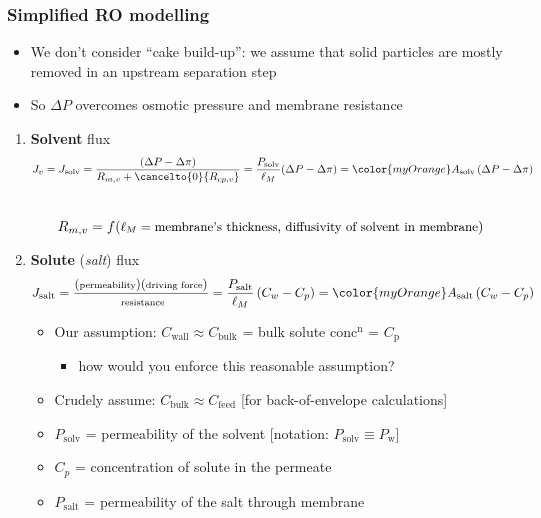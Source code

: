\begin{frame}\frametitle{Simplified RO modelling}
	\begin{itemize}
		\item	We don't consider ``cake build-up'': we assume that solid particles are mostly removed in an upstream separation step
		\item	So $\Delta P$ overcomes osmotic pressure and membrane resistance
	\end{itemize}
	\vspace{-6pt}
	\begin{enumerate}
		\item	\textbf{Solvent} flux
			\[	J_v = J_\text{solv} = \frac{(\Delta P - \Delta \pi)}{R_{m,v} + \cancelto{0}{R_{cp,v}}} = \frac{P_\text{solv}}{\ell_M}(\Delta P - \Delta \pi) = {\color{myOrange}A_\text{solv}\left(\Delta P - \Delta \pi\right)} \] \\
			\[	R_{m,v} = f(\text{\small $\ell_M=\text{membrane's thickness}$, diffusivity of solvent in membrane})\]
		\item	\textbf{Solute} (\emph{salt}) flux
			\[
				J_\text{salt} = {\scriptsize \dfrac{(\text{permeability})(\text{driving force})}{\text{ resistance}} }= \dfrac{P_\text{salt}}{\ell_M} \left(C_w - C_p\right) = {\color{myOrange}A_\text{salt} \left(C_w - C_p\right)}
			\]
			\begin{itemize}
				\item	Our assumption: $C_\text{wall} \approx C_\text{bulk}$ = bulk solute conc$^\text{n}$ = $C_\text{p}$
				\begin{itemize}
					\item	how would you enforce this reasonable assumption?  %
				\end{itemize}
				\item	Crudely assume: $C_\text{bulk}  \approx C_\text{feed}$ {\scriptsize [for back-of-envelope calculations]}
				\item	$P_\text{solv}$ = permeability of the solvent [notation: $P_\text{solv} \equiv P_\text{w}$]
				\item	$C_p$ = concentration of solute in the permeate
				\item	$P_\text{salt}$ = permeability of the salt through membrane
			\end{itemize}
	\end{enumerate}
\end{frame}

